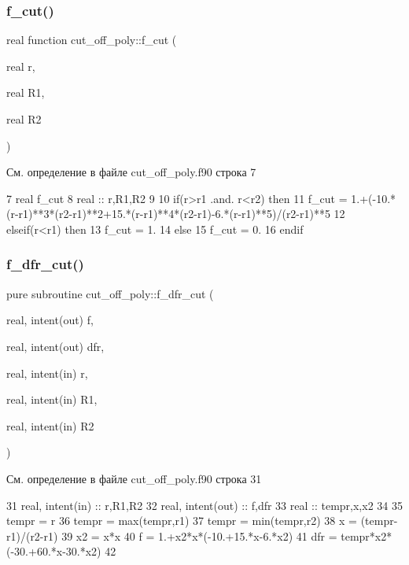 \subsubsection{\texorpdfstring{f\+\_\+cut()}{f\_cut()}}
{\footnotesize\ttfamily real function cut\+\_\+off\+\_\+poly\+::f\+\_\+cut (\begin{DoxyParamCaption}\item[{real}]{r,  }\item[{real}]{R1,  }\item[{real}]{R2 }\end{DoxyParamCaption})}



См. определение в файле cut\+\_\+off\+\_\+poly.\+f90 строка 7


\begin{DoxyCode}
7     \textcolor{keywordtype}{real} f\_cut
8     \textcolor{keywordtype}{real} :: r,R1,R2
9     
10     \textcolor{keywordflow}{if}(r>r1 .and. r<r2) \textcolor{keywordflow}{then}
11         f\_cut = 1.+(-10.*(r-r1)**3*(r2-r1)**2+15.*(r-r1)**4*(r2-r1)-6.*(r-r1)**5)/(r2-r1)**5
12     \textcolor{keywordflow}{elseif}(r<r1) \textcolor{keywordflow}{then}
13         f\_cut = 1.
14     \textcolor{keywordflow}{else}
15         f\_cut = 0.
16 \textcolor{keywordflow}{    endif}
\end{DoxyCode}
\mbox{\label{namespacecut__off__poly_aa06a8a5bc68fa128e1a5bb543fce787b}} 
\subsubsection{\texorpdfstring{f\+\_\+dfr\+\_\+cut()}{f\_dfr\_cut()}}
{\footnotesize\ttfamily pure subroutine cut\+\_\+off\+\_\+poly\+::f\+\_\+dfr\+\_\+cut (\begin{DoxyParamCaption}\item[{real, intent(out)}]{f,  }\item[{real, intent(out)}]{dfr,  }\item[{real, intent(in)}]{r,  }\item[{real, intent(in)}]{R1,  }\item[{real, intent(in)}]{R2 }\end{DoxyParamCaption})}



См. определение в файле cut\+\_\+off\+\_\+poly.\+f90 строка 31


\begin{DoxyCode}
31     \textcolor{keywordtype}{real}, \textcolor{keywordtype}{intent(in)} :: r,R1,R2
32     \textcolor{keywordtype}{real}, \textcolor{keywordtype}{intent(out)} :: f,dfr
33     \textcolor{keywordtype}{real} :: tempr,x,x2
34     
35     tempr = r
36     tempr = max(tempr,r1)
37     tempr = min(tempr,r2)
38     x = (tempr-r1)/(r2-r1)
39     x2 = x*x
40     f = 1.+x2*x*(-10.+15.*x-6.*x2)
41     dfr = tempr*x2*(-30.+60.*x-30.*x2)
42     
\end{DoxyCode}
